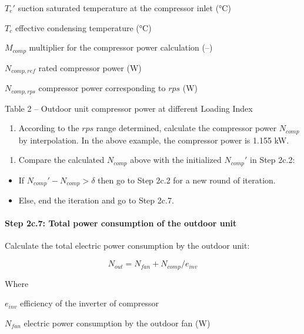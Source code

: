 \({T_e}'\) suction saturated temperature at the compressor inlet (°C)

\(T_c\) effective condensing temperature (°C)

\(M_{comp}\) multiplier for the compressor power calculation (--)

\(N_{comp,ref}\) rated compressor power (W)

\(N_{comp,rps}\) compressor power corresponding to \(rps\) (W)

Table 2 -- Outdoor unit compressor power at different Loading Index



\begin{enumerate}
\def\labelenumi{\alph{enumi}.}
\setcounter{enumi}{1}
\tightlist
\item
  According to the \(rps\) range determined, calculate the compressor power \(N_{comp}\) by interpolation. In the above example, the compressor power is 1.155 kW. 
\end{enumerate}

\begin{enumerate}
\def\labelenumi{(\arabic{enumi})}
\setcounter{enumi}{1}
\tightlist
\item
  Compare the calculated \(N_{comp}\) above with the initialized \({N_{comp}}'\) in Step 2c.2:
\end{enumerate}

\begin{itemize}
\item
  If \({N_{comp}}'-N_{comp}>\delta\) then go to Step 2c.2 for a new round of iteration.
\item
  Else, end the iteration and go to Step 2c.7.
\end{itemize}

\paragraph{Step 2c.7: Total power consumption of the outdoor unit}\label{step-2c.7-total-power-consumption-of-the-outdoor-unit}

Calculate the total electric power consumption by the outdoor unit:

\begin{equation}
N_{out} = N_{fan}+N_{comp}/e_{inv}
\end{equation}

Where

\(e_{inv}\) efficiency of the inverter of compressor

\(N_{fan}\) electric power consumption by the outdoor fan (W)

